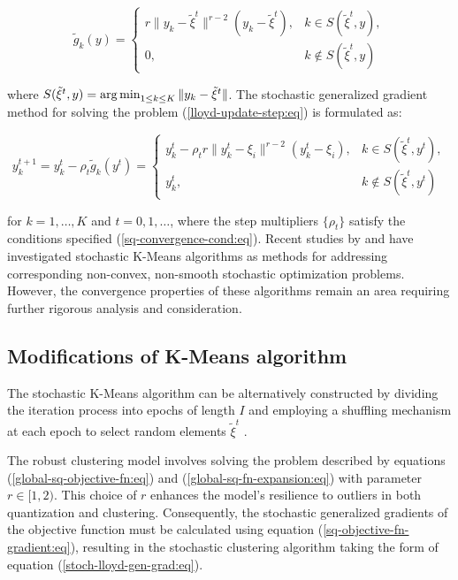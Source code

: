 \begin{equation}
    \label{stoch-lloyd-grad-component:eq}
    \tilde{g}_k(y) = \begin{cases}
        r\|y_{k} - \tilde{\xi}^t\|^{r-2} (y_{k} - \tilde{\xi}^t), & k \in S(\tilde{\xi}^t,y),\\
        0, & k \notin S(\tilde{\xi}^t,y)
    \end{cases}
\end{equation}

\noindent where $S(\tilde{\xi}^t,y) = \operatorname*{arg\,min}_{1 \leq k \leq K} \| y_k - \tilde{\xi}^t \|$. The stochastic generalized gradient method for solving the problem (\ref{lloyd-update-step:eq}) is formulated as:

\begin{equation}
    \label{stoch-lloyd-gen-grad:eq}
    y_k^{t+1} = y_k^t - \rho_t \tilde{g}_k(y^t) = \begin{cases}
        y_k^t - \rho_t r\|y_k^t - \xi_i\|^{r-2}(y_k^t - \xi_i), & k \in S(\tilde{\xi}^t,y^t), \\
        y_k^t, & k \notin S(\tilde{\xi}^t,y^t)
    \end{cases}
\end{equation}

\noindent for $k=1,\ldots,K$ and $t=0,1,\ldots$, where the step multipliers $\{\rho_t\}$ satisfy the conditions specified (\ref{sq-convergence-cond:eq}). Recent studies by \cite{Tang_2017} and \cite{Zhao_Lan_Chen_Ngo_2021} have investigated stochastic K-Means algorithms as methods for addressing corresponding non-convex, non-smooth stochastic optimization problems. However, the convergence properties of these algorithms remain an area requiring further rigorous analysis and consideration.

\subsection{Modifications of K-Means algorithm}

The stochastic K-Means algorithm can be alternatively constructed by dividing the iteration process into epochs of length $I$ and employing a shuffling mechanism at each epoch to select random elements $\tilde{\xi}^t$ \cite{bottou2009curiously,montavon2012neural}. 

The robust clustering model involves solving the problem described by equations (\ref{global-sq-objective-fn:eq}) and (\ref{global-sq-fn-expansion:eq}) with parameter $r \in [1,2)$. This choice of $r$ enhances the model's resilience to outliers in both quantization and clustering. Consequently, the stochastic generalized gradients of the objective function must be calculated using equation (\ref{sq-objective-fn-gradient:eq}), resulting in the stochastic clustering algorithm taking the form of equation (\ref{stoch-lloyd-gen-grad:eq}).

